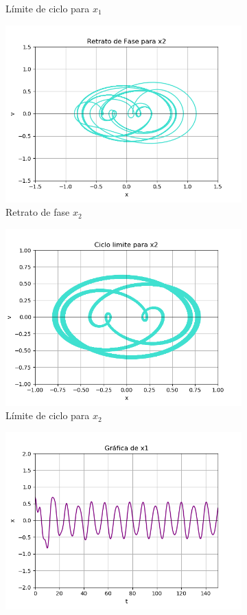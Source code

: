 \documentclass[12pt]{article}
\begin{document}
\begin{figure}[h!]
\begin{subfigure}{.55\textwidth}
  \caption{Límite de ciclo para $x_1$}
  \label{fig:sfig2}
\end{subfigure}
\begin{subfigure}{.55\textwidth}
  \centering
  \includegraphics[width=.8\linewidth]{Ej4_12.png}
  \caption{Retrato de fase $x_2$}
  \label{fig:sfig2}
\end{subfigure}
\begin{subfigure}{.55\textwidth}
  \centering
  \includegraphics[width=.8\linewidth]{Ej4_16.png}
  \caption{Límite de ciclo para $x_2$}
  \label{fig:sfig2}
\end{subfigure}
\begin{subfigure}{.55\textwidth}
  \centering
  \includegraphics[width=.8\linewidth]{Ej4_13.png}

\end{subfigure}
\end{figure}
\end{document}
